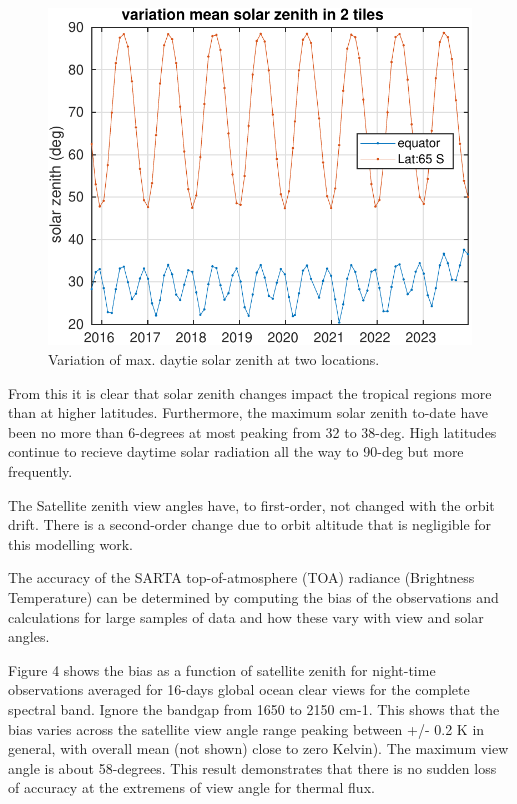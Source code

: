 \documentclass[11pt,twocolumn]{article}
\begin{document}
\begin{figure}[htbp]
\centering
\includegraphics[width=\linewidth]{./Figs/solzen_mean_var_vs_time_two_tiles.pdf}
\caption{\label{fig:orgf6961e4}Variation of max. daytie solar zenith at two locations.}
\end{figure}

From this it is clear that solar zenith changes impact the tropical regions
more than at higher latitudes. Furthermore, the maximum solar zenith to-date have been
no more than 6-degrees at most peaking from 32 to 38-deg. High latitudes continue to
recieve daytime solar radiation all the way to 90-deg but more frequently.

The Satellite zenith view angles have, to first-order, not changed with the orbit drift.
There is a second-order change due to orbit altitude that is negligible for this
modelling work.

The accuracy of the SARTA top-of-atmosphere (TOA) radiance (Brightness Temperature)
can be determined by computing the bias of the observations and calculations for
large samples of data and how these vary with view and solar angles.

Figure 4 shows the bias as a function of satellite zenith for night-time observations
averaged for 16-days global ocean clear views for the complete spectral band.
Ignore the bandgap from 1650 to 2150 cm-1. This shows that the bias varies across the
satellite view angle range peaking between +/- 0.2 K in general, with overall mean
(not shown) close to zero Kelvin). The maximum view angle is about 58-degrees. This
result demonstrates that there is no sudden loss of accuracy at the extremens of
view angle for thermal flux.
\end{document}
